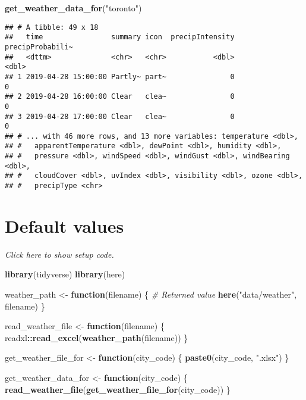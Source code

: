 \documentclass[]{book}
\newenvironment{Shaded}{\begin{snugshade}}{\end{snugshade}}
\newcommand{\CommentTok}[1]{\textcolor[rgb]{0.56,0.35,0.01}{\textit{#1}}}
\newcommand{\ControlFlowTok}[1]{\textcolor[rgb]{0.13,0.29,0.53}{\textbf{#1}}}
\newcommand{\KeywordTok}[1]{\textcolor[rgb]{0.13,0.29,0.53}{\textbf{#1}}}
\newcommand{\NormalTok}[1]{#1}
\newcommand{\OperatorTok}[1]{\textcolor[rgb]{0.81,0.36,0.00}{\textbf{#1}}}
\newcommand{\StringTok}[1]{\textcolor[rgb]{0.31,0.60,0.02}{#1}}
\begin{document}
\begin{enumerate}
\begin{Shaded}
\begin{Highlighting}[]
\KeywordTok{get_weather_data_for}\NormalTok{(}\StringTok{"toronto"}\NormalTok{)}
\end{Highlighting}
\end{Shaded}

\begin{verbatim}
## # A tibble: 49 x 18
##   time                summary icon  precipIntensity precipProbabili~
##   <dttm>              <chr>   <chr>           <dbl>            <dbl>
## 1 2019-04-28 15:00:00 Partly~ part~               0                0
## 2 2019-04-28 16:00:00 Clear   clea~               0                0
## 3 2019-04-28 17:00:00 Clear   clea~               0                0
## # ... with 46 more rows, and 13 more variables: temperature <dbl>,
## #   apparentTemperature <dbl>, dewPoint <dbl>, humidity <dbl>,
## #   pressure <dbl>, windSpeed <dbl>, windGust <dbl>, windBearing <dbl>,
## #   cloudCover <dbl>, uvIndex <dbl>, visibility <dbl>, ozone <dbl>,
## #   precipType <chr>
\end{verbatim}
\end{enumerate}

\hypertarget{default-values}{%
\section{Default values}\label{default-values}}

\emph{Click here to show setup code.}

\begin{Shaded}
\begin{Highlighting}[]
\KeywordTok{library}\NormalTok{(tidyverse)}
\KeywordTok{library}\NormalTok{(here)}


\NormalTok{weather_path <-}\StringTok{ }\ControlFlowTok{function}\NormalTok{(filename) \{}
  \CommentTok{# Returned value}
  \KeywordTok{here}\NormalTok{(}\StringTok{"data/weather"}\NormalTok{, filename)}
\NormalTok{\}}

\NormalTok{read_weather_file <-}\StringTok{ }\ControlFlowTok{function}\NormalTok{(filename) \{}
\NormalTok{  readxl}\OperatorTok{::}\KeywordTok{read_excel}\NormalTok{(}\KeywordTok{weather_path}\NormalTok{(filename))}
\NormalTok{\}}

\NormalTok{get_weather_file_for <-}\StringTok{ }\ControlFlowTok{function}\NormalTok{(city_code) \{}
  \KeywordTok{paste0}\NormalTok{(city_code, }\StringTok{".xlsx"}\NormalTok{)}
\NormalTok{\}}

\NormalTok{get_weather_data_for <-}\StringTok{ }\ControlFlowTok{function}\NormalTok{(city_code) \{}
  \KeywordTok{read_weather_file}\NormalTok{(}\KeywordTok{get_weather_file_for}\NormalTok{(city_code))}
\NormalTok{\}}
\end{Highlighting}
\end{Shaded}
\end{document}
